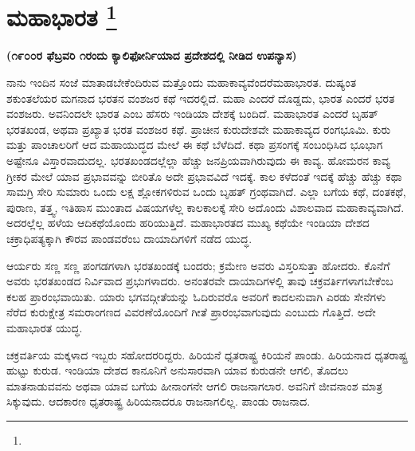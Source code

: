 
\chapter[ಮಹಾಭಾರತ ]{ಮಹಾಭಾರತ \protect\footnote{}}

\centerline{\textbf{(೧೯೦೦ರ ಫೆಬ್ರವರಿ ೧ರಂದು ಕ್ಯಾಲಿಫೋರ್ನಿಯಾದ ಪ್ರದೇಶದಲ್ಲಿ ನೀಡಿದ ಉಪನ್ಯಾಸ)}}

\vskip 0.3cm

ನಾನು ಇಂದಿನ ಸಂಜೆ ಮಾತಾಡಬೇಕೆಂದಿರುವ ಮತ್ತೊಂದು ಮಹಾಕಾವ್ಯವೆಂದರೆ\break ಮಹಾಭಾರತ. ದುಷ್ಯಂತ ಶಕುಂತಲೆಯರ ಮಗನಾದ ಭರತನ ವಂಶಜರ ಕಥೆ ಇದರಲ್ಲಿದೆ. ಮಹಾ ಎಂದರೆ ದೊಡ್ಡದು, ಭಾರತ ಎಂದರೆ ಭರತ ವಂಶಜರು. ಅವನಿಂದಲೇ ಭಾರತ ಎಂಬ ಹೆಸರು ಇಂಡಿಯಾ ದೇಶಕ್ಕೆ ಬಂದಿದೆ. ಮಹಾಭಾರತ ಎಂದರೆ ಬೃಹತ್​ ಭರತಖಂಡ, ಅಥವಾ ಪ್ರಖ್ಯಾತ ಭರತ ವಂಶಜರ ಕಥೆ. ಪ್ರಾಚೀನ ಕುರುದೇಶವೇ ಮಹಾಕಾವ್ಯದ ರಂಗಭೂಮಿ. ಕುರು ಮತ್ತು ಪಾಂಚಾಲರಿಗೆ ಆದ ಮಹಾಯುದ್ಧದ ಮೇಲೆ ಈ ಕಥೆ ಬೆಳೆದಿದೆ. ಕಥಾ ಪ್ರಸಂಗಕ್ಕೆ ಸಂಬಂಧಿಸಿದ ಭೂಭಾಗ ಅಷ್ಟೇನೂ ವಿಸ್ತಾರವಾದುದಲ್ಲ. ಭರತಖಂಡದಲ್ಲೆಲ್ಲಾ ಹೆಚ್ಚು ಜನಪ್ರಿಯವಾಗಿರುವುದು ಈ ಕಾವ್ಯ. ಹೋಮರನ ಕಾವ್ಯ ಗ್ರೀಕರ ಮೇಲೆ ಯಾವ ಪ್ರಭಾವವನ್ನು ಬೀರಿತೊ ಅದೇ ಪ್ರಭಾವವಿದೆ ಇದಕ್ಕೆ. ಕಾಲ ಕಳೆದಂತೆ ಇದಕ್ಕೆ ಹೆಚ್ಚು ಹೆಚ್ಚು ಕಥಾ ಸಾಮಗ್ರಿ ಸೇರಿ ಸುಮಾರು ಒಂದು ಲಕ್ಷ ಶ್ಲೋಕಗಳಿರುವ ಒಂದು ಬೃಹತ್​ ಗ್ರಂಥವಾಗಿದೆ. ಎಲ್ಲಾ ಬಗೆಯ ಕಥೆ, ದಂತಕಥೆ, ಪುರಾಣ, ತತ್ತ್ವ, ಇತಿಹಾಸ ಮುಂತಾದ ವಿಷಯಗಳೆಲ್ಲ ಕಾಲಕಾಲಕ್ಕೆ ಸೇರಿ ಅದೊಂದು ವಿಶಾಲವಾದ ಮಹಾಕಾವ್ಯವಾಗಿದೆ. ಅದರಲ್ಲೆಲ್ಲ ಹಳೆಯ ಆದಿಕಥೆಯೊಂದು ಹರಿಯುತ್ತಿದೆ. ಮಹಾಭಾರತದ ಮುಖ್ಯ ಕಥೆಯೇ ಇಂಡಿಯಾ ದೇಶದ ಚಕ್ರಾಧಿಪತ್ಯಕ್ಕಾಗಿ ಕೌರವ ಪಾಂಡವರೆಂಬ ದಾಯಾದಿಗಳಿಗೆ ನಡೆದ ಯುದ್ಧ.

\vskip 0.1cm

ಆರ್ಯರು ಸಣ್ಣ ಸಣ್ಣ ಪಂಗಡಗಳಾಗಿ ಭರತಖಂಡಕ್ಕೆ ಬಂದರು; ಕ್ರಮೇಣ ಅವರು ವಿಸ್ತರಿಸುತ್ತಾ ಹೋದರು. ಕೊನೆಗೆ ಅವರು ಭರತಖಂಡದ ನಿರ್ವಿವಾದ ಪ್ರಭುಗಳಾದರು. ಅನಂತರವೇ ದಾಯಾದಿಗಳಲ್ಲಿ ತಾವು ಚಕ್ರವರ್ತಿಗಳಾಗಬೇಕೆಂಬ ಕಲಹ ಪ್ರಾರಂಭವಾಯಿತು. ಯಾರು ಭಗವದ್ಗೀತೆಯನ್ನು ಓದಿರುವರೊ ಅವರಿಗೆ ಕಾದಲನುವಾಗಿ ಎರಡು ಸೇನೆಗಳು ನೆರೆದ ಕುರುಕ್ಷೇತ್ರ ಸಮರಾಂಗಣದ ವಿವರಣೆಯೊಂದಿಗೆ ಗೀತೆ ಪ್ರಾರಂಭವಾಗುವುದು ಎಂಬುದು ಗೊತ್ತಿದೆ. ಅದೇ ಮಹಾಭಾರತ ಯುದ್ಧ.

\vskip 0.1cm

ಚಕ್ರವರ್ತಿಯ ಮಕ್ಕಳಾದ ಇಬ್ಬರು ಸಹೋದರರಿದ್ದರು. ಹಿರಿಯನೆ ಧೃತರಾಷ್ಟ್ರ ಕಿರಿಯನೆ ಪಾಂಡು. ಹಿರಿಯನಾದ ಧೃತರಾಷ್ಟ್ರ ಹುಟ್ಟು ಕುರುಡ. ಇಂಡಿಯಾ ದೇಶದ ಕಾನೂನಿಗೆ ಅನುಸಾರವಾಗಿ ಯಾವ ಕುರುಡನೇ ಆಗಲಿ, ತೊದಲು ಮಾತನಾಡುವವನು ಅಥವಾ ಯಾವ ಬಗೆಯ ಹೀನಾಂಗನೇ ಆಗಲಿ ರಾಜನಾಗಲಾರ. ಅವನಿಗೆ ಜೀವನಾಂಶ ಮಾತ್ರ ಸಿಕ್ಕುವುದು. ಆದಕಾರಣ ಧೃತರಾಷ್ಟ್ರ ಹಿರಿಯನಾದರೂ ರಾಜನಾಗಲಿಲ್ಲ. ಪಾಂಡು ರಾಜನಾದ.

\vskip 0.1cm

